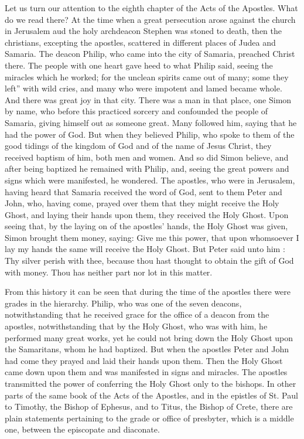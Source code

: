 Let us turn our attention to the eighth chapter
of the Acts of the Apostles. What do we 
read there? At the time when a great persecution
arose against the church in Jerusalem aud 
the holy archdeacon Stephen was stoned to 
death, then the christians, excepting the 
apostles, scattered in different places of Judea 
and Samaria. The deacon Philip, who came 
into the city of Samaria, preached Christ there. 
The people with one heart gave heed to what 
Philip said, seeing the miracles which he 
worked; for the unclean spirits came out of 
many; some they left'' with wild cries, and many 
who were impotent and lamed became whole. 
And there was great joy in that city. There 
was a man in that place, one Simon by name, 
who before this practiced sorcery and confounded
the people of Samaria, giving himself 
out as someone great. Many followed him, 
saying that he had the power of God. But 
when they believed Philip, who spoke to them 
of the good tidings of the kingdom of God and 
of the name of Jesus Christ, they received baptism
of him, both men and women. And so did 
Simon believe, and after being baptized he remained
with Philip, and, seeing the great 
powers and signs which were manifested, he 
wondered. The apostles, who were in Jerusalem,
having heard that Samaria received the 
word of God, sent to them Peter and John, who, 
having come, prayed over them that they might 
receive the Holy Ghost, and laying their hands 
upon them, they received the Holy Ghost. 
Upon seeing that, by the laying on of the 
apostles' hands, the Holy Ghost was given,
Simon brought them money, saying: Give me 
this power, that upon whomsoever I lay my 
hands the same will receive the Holy Ghost. 
But Peter said unto him : Thy silver perish 
with thee, because thou hast thought to obtain 
the gift of God with money. Thou has neither 
part nor lot in this matter. 

From this history it can be seen that during the 
time of the apostles there were grades in the 
hierarchy. Philip, who was one of the seven deacons,
notwithstanding that he received grace 
for the office of a deacon from the apostles,
notwithstanding that by the Holy Ghost, who was 
with him, he performed many great works, yet 
he could not bring down the Holy Ghost upon 
the Samaritans, whom he had baptized. But 
when the apostles Peter and John had come 
they prayed and laid their hands upon them. 
Then the Holy Ghost came down upon them 
and was manifested in signs and miracles. The 
apostles transmitted the power of conferring 
the Holy Ghost only to the bishops. In other 
parts of the same book of the Acts of the Apostles,
and in the epistles of St. Paul to Timothy, 
the Bishop of Ephesus, and to Titus, the Bishop 
of Crete, there are plain statements pertaining 
to the grade or office of presbyter, which is a
middle one, between the episcopate and diaconate. 

